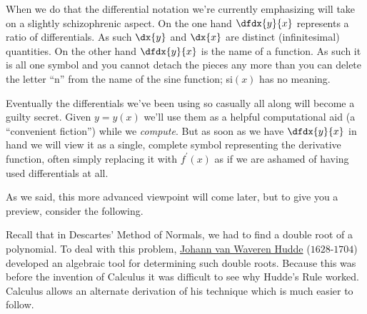 When we do that the differential notation we're currently emphasizing
will take on a slightly schizophrenic aspect. On the one hand
$\dfdx{y}{x}$ represents a ratio of differentials. As such $\dx{y}$
and $\dx{x}$ are distinct (infinitesimal) quantities. On the other
hand $\dfdx{y}{x}$ is the name of a function. As such it is all one
symbol and you cannot detach the pieces any more than you can delete
the letter ``n'' from the name of the sine function; si$(x)$ has no
meaning.

Eventually the differentials we've been using so casually all along
will become a guilty secret. Given $y=y(x)$ we'll use them as a
helpful computational aid (a ``convenient fiction'') while we
\emph{compute}. But as soon as we have
$\dfdx{y}{x}$ in hand we will view it as a single, complete symbol
representing the derivative function, often simply replacing it with
$f^\prime(x)$ as if we are ashamed of having used differentials at all.

As we said, this more advanced viewpoint will come later, but to give
you a preview, consider the following.

Recall that in Descartes' Method of Normals, we had to find a double
root of a polynomial.  To deal with this problem,
\href{https://mathshistory.st-andrews.ac.uk/Biographies/Hudde/}{Johann
  van Waveren Hudde} ($1628$-$1704$) developed an algebraic tool for
determining such double roots. Because this was before the invention
of Calculus it was difficult to see why Hudde's Rule worked. Calculus
allows an alternate derivation of his technique which is much easier
to follow.

